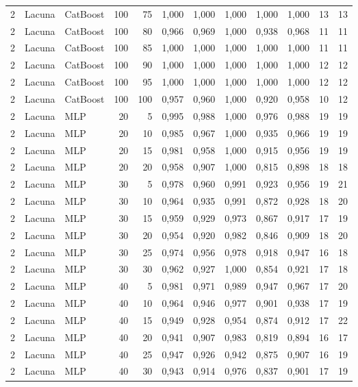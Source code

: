 \begin{longtable}{@{}rllrrrrrrrrr@{}}
2 & Lacuna & CatBoost & 100 & 75 & 1,000 & 1,000 & 1,000 & 1,000 & 1,000 & 13 & 13 \\
2 & Lacuna & CatBoost & 100 & 80 & 0,966 & 0,969 & 1,000 & 0,938 & 0,968 & 11 & 11 \\
2 & Lacuna & CatBoost & 100 & 85 & 1,000 & 1,000 & 1,000 & 1,000 & 1,000 & 11 & 11 \\
2 & Lacuna & CatBoost & 100 & 90 & 1,000 & 1,000 & 1,000 & 1,000 & 1,000 & 12 & 12 \\
2 & Lacuna & CatBoost & 100 & 95 & 1,000 & 1,000 & 1,000 & 1,000 & 1,000 & 12 & 12 \\
2 & Lacuna & CatBoost & 100 & 100 & 0,957 & 0,960 & 1,000 & 0,920 & 0,958 & 10 & 12 \\
2 & Lacuna & MLP & 20 & 5 & 0,995 & 0,988 & 1,000 & 0,976 & 0,988 & 19 & 19 \\
2 & Lacuna & MLP & 20 & 10 & 0,985 & 0,967 & 1,000 & 0,935 & 0,966 & 19 & 19 \\
2 & Lacuna & MLP & 20 & 15 & 0,981 & 0,958 & 1,000 & 0,915 & 0,956 & 19 & 19 \\
2 & Lacuna & MLP & 20 & 20 & 0,958 & 0,907 & 1,000 & 0,815 & 0,898 & 18 & 18 \\
2 & Lacuna & MLP & 30 & 5 & 0,978 & 0,960 & 0,991 & 0,923 & 0,956 & 19 & 21 \\
2 & Lacuna & MLP & 30 & 10 & 0,964 & 0,935 & 0,991 & 0,872 & 0,928 & 18 & 20 \\
2 & Lacuna & MLP & 30 & 15 & 0,959 & 0,929 & 0,973 & 0,867 & 0,917 & 17 & 19 \\
2 & Lacuna & MLP & 30 & 20 & 0,954 & 0,920 & 0,982 & 0,846 & 0,909 & 18 & 20 \\
2 & Lacuna & MLP & 30 & 25 & 0,974 & 0,956 & 0,978 & 0,918 & 0,947 & 16 & 18 \\
2 & Lacuna & MLP & 30 & 30 & 0,962 & 0,927 & 1,000 & 0,854 & 0,921 & 17 & 18 \\
2 & Lacuna & MLP & 40 & 5 & 0,981 & 0,971 & 0,989 & 0,947 & 0,967 & 17 & 20 \\
2 & Lacuna & MLP & 40 & 10 & 0,964 & 0,946 & 0,977 & 0,901 & 0,938 & 17 & 19 \\
2 & Lacuna & MLP & 40 & 15 & 0,949 & 0,928 & 0,954 & 0,874 & 0,912 & 17 & 22 \\
2 & Lacuna & MLP & 40 & 20 & 0,941 & 0,907 & 0,983 & 0,819 & 0,894 & 16 & 17 \\
2 & Lacuna & MLP & 40 & 25 & 0,947 & 0,926 & 0,942 & 0,875 & 0,907 & 16 & 19 \\
2 & Lacuna & MLP & 40 & 30 & 0,943 & 0,914 & 0,976 & 0,837 & 0,901 & 17 & 19 \\

\end{longtable}
